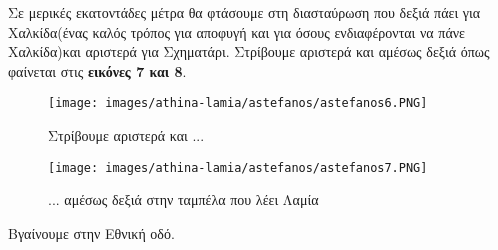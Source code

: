 \break
Σε μερικές εκατοντάδες μέτρα θα φτάσουμε στη διασταύρωση που δεξιά πάει για Χαλκίδα(ένας καλός τρόπος για αποφυγή και για όσους ενδιαφέρονται να πάνε Χαλκίδα)και αριστερά για Σχηματάρι. Στρίβουμε αριστερά  και αμέσως δεξιά όπως φαίνεται στις \textbf{εικόνες 7 και 8}.

\begin{figure}[hbp!]
	\centering
		\texttt{[image: images/athina-lamia/astefanos/astefanos6.PNG]}
			\caption{Στρίβουμε αριστερά και ...}
\end{figure}
\begin{figure}[hbp!]
	\centering
		\texttt{[image: images/athina-lamia/astefanos/astefanos7.PNG]}
			\caption{... αμέσως δεξιά στην ταμπέλα που λέει Λαμία}
\end{figure}

Βγαίνουμε στην Εθνική οδό.

